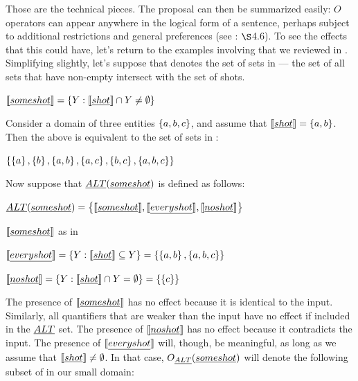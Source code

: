\documentclass{article}
\begin{document}
Those are the technical pieces. The proposal can then be summarized
easily: $O$ operators can appear anywhere in the logical form of a
sentence, perhaps subject to additional restrictions and general
preferences (see \CFS: $\S$4.6). To see the effects that this could
have, let's return to the examples involving  that we
reviewed in . Simplifying slightly, let's
suppose that  denotes the set of sets in 
--- the set of all sets that have non-empty intersect with the set of
shots.
%
\begin{examples}
\item\label{someshot} $\llbracket\emph{some shot}\rrbracket = \left\{ Y : \llbracket\emph{shot}\rrbracket \cap Y \neq \emptyset \right\}$
\end{examples}
%
Consider a domain of three entities $\left\{ a,b,c \right\}$, and assume that
$\llbracket\emph{shot}\rrbracket = \left\{ a,b \right\}$. Then the above is equivalent to the
set of sets in :
%
\begin{examples}
\item\label{someshotex}
  $\left\{ \left\{ a \right\}, \left\{ b \right\}, \left\{ a,b \right\}, \left\{ a,c \right\}, \left\{ b,c \right\}, \left\{ a,b,c \right\} \right\}$
\end{examples}
%
Now suppose that $\emph{ALT}(\emph{some shot})$ is defined as follows:
%
\begin{examples}
\item\label{altsome} $\emph{ALT}(\emph{some shot}) =  
  \left\{ 
    \llbracket\emph{some shot}\rrbracket, 
    \llbracket\emph{every shot}\rrbracket, 
    \llbracket\emph{no shot}\rrbracket
   \right\}$
  \begin{examples}
  \item $\llbracket\emph{some shot}\rrbracket$ as in 
  \item $\llbracket\emph{every shot}\rrbracket = \left\{ Y : \llbracket\emph{shot}\rrbracket \subseteq Y \right\} = \left\{ \left\{ a,b \right\}, \left\{ a,b,c \right\} \right\}$
  \item $\llbracket\emph{no shot}\rrbracket = \left\{ Y : \llbracket\emph{shot}\rrbracket \cap Y = \emptyset \right\} = \left\{ \left\{ c \right\} \right\}$      
  \end{examples}
\end{examples}
%
The presence of $\llbracket\emph{some shot}\rrbracket$ has no effect because it is
identical to the input. Similarly, all quantifiers that are weaker
than the input have no effect if included in the $\emph{ALT}$ set. The
presence of $\llbracket\emph{no shot}\rrbracket$ has no effect because it
contradicts the input. The presence of $\llbracket\emph{every shot}\rrbracket$ will,
though, be meaningful, as long as we assume that
$\llbracket\emph{shot}\rrbracket \neq \emptyset$.  In that case,
$O_{\emph{ALT}}(\emph{some shot})$ will denote the following subset of
 in our small domain:
\end{document}

